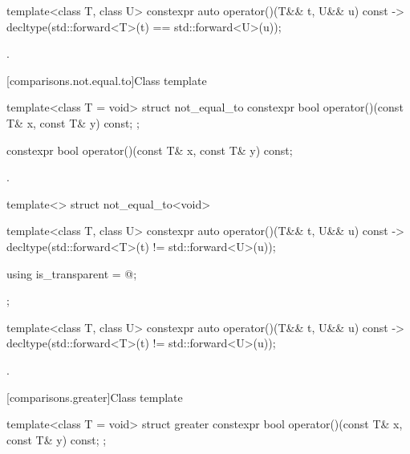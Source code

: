 %
\begin{itemdecl}
template<class T, class U> constexpr auto operator()(T&& t, U&& u) const
    -> decltype(std::forward<T>(t) == std::forward<U>(u));
\end{itemdecl}

\begin{itemdescr}
\pnum
\returns
{}.
\end{itemdescr}

[comparisons.not.equal.to]{Class template }

%
\begin{itemdecl}
template<class T = void> struct not_equal_to {
  constexpr bool operator()(const T& x, const T& y) const;
};
\end{itemdecl}

%
\begin{itemdecl}
constexpr bool operator()(const T& x, const T& y) const;
\end{itemdecl}

\begin{itemdescr}
\pnum
\returns
{}.
\end{itemdescr}

%
\begin{itemdecl}
template<> struct not_equal_to<void> {
  template<class T, class U> constexpr auto operator()(T&& t, U&& u) const
    -> decltype(std::forward<T>(t) != std::forward<U>(u));

  using is_transparent = @\unspec@;
};
\end{itemdecl}

%
\begin{itemdecl}
template<class T, class U> constexpr auto operator()(T&& t, U&& u) const
    -> decltype(std::forward<T>(t) != std::forward<U>(u));
\end{itemdecl}

\begin{itemdescr}
\pnum
\returns
{}.
\end{itemdescr}

[comparisons.greater]{Class template }

%
\begin{itemdecl}
template<class T = void> struct greater {
  constexpr bool operator()(const T& x, const T& y) const;
};
\end{itemdecl}

